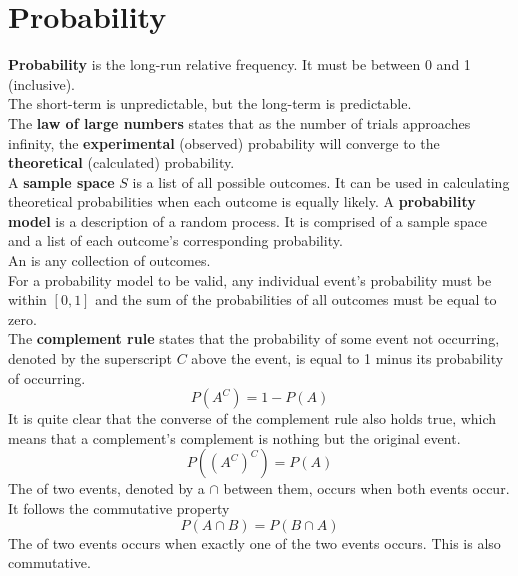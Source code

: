 \documentclass[../AP_Statistics.tex]{subfiles}
\begin{document}
	\chapter{Probability}
		\textbf{Probability} is the long-run relative frequency. It must be between 0 and 1 (inclusive). \\
		The short-term is unpredictable, but the long-term is predictable. \\
		The \textbf{law of large numbers} states that as the number of trials approaches infinity, the \textbf{experimental} (observed) probability will converge to the \textbf{theoretical} (calculated) probability. \\
		A \textbf{sample space} $S$ is a list of all possible outcomes. It can be used in calculating theoretical probabilities when each outcome is equally likely.
		A \textbf{probability model} is a description of a random process. It is comprised of a sample space and a list of each outcome's corresponding probability. \\
		An  is any collection of outcomes. \\
		For a probability model to be valid, any individual event's probability must be within $[0, 1]$ and the sum of the probabilities of all outcomes must be equal to zero. \\
		The \textbf{complement rule} states that the probability of some event not occurring, denoted by the superscript $C$ above the event, is equal to 1 minus its probability of occurring. \\
		\[P\left(A^C\right) = 1 - P(A)\]
		It is quite clear that the converse of the complement rule also holds true, which means that a complement's complement is nothing but the original event. 
		\[P\left(\left(A^C\right)^C\right) = P(A)\]
		The  of two events, denoted by a $\cap$ between them, occurs when both events occur. It follows the commutative property
		\[P(A\cap B) = P(B\cap A)\]
		The  of two events occurs when exactly one of the two events occurs. This is also commutative. \\
\end{document}
